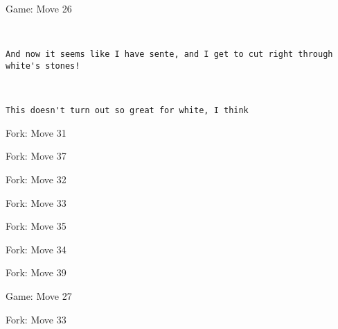 \documentclass{article}
\begin{document}
\begin{section}{Game: Move 26}
\begin{center}
\cleargoban
{}
\showfullgoban
\\\begin{lstlisting}
And now it seems like I have sente, and I get to cut right through white's stones!\end{lstlisting}
\end{center}
\begin{center}
\cleargoban
{}
\showfullgoban
\\\begin{lstlisting}
This doesn't turn out so great for white, I think\end{lstlisting}
\end{center}
\end{section}
\begin{subsection}{Fork: Move 31}
\end{subsection}
\begin{subsection}{Fork: Move 37}
\end{subsection}
\begin{subsection}{Fork: Move 32}
\end{subsection}
\begin{subsection}{Fork: Move 33}
\end{subsection}
\begin{subsection}{Fork: Move 35}
\end{subsection}
\begin{subsection}{Fork: Move 34}
\end{subsection}
\begin{subsection}{Fork: Move 39}
\end{subsection}
\newpage
\begin{section}{Game: Move 27}
\end{section}
\begin{subsection}{Fork: Move 33}
\end{subsection}
\newpage
\end{document}
